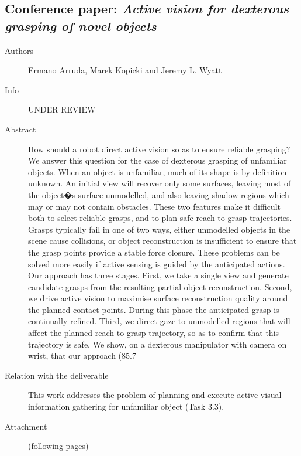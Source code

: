 \documentclass[a4paper,11pt,pdf]{../templates/pacmanreport}
\begin{document}

\subsection{Conference paper: \em Active vision for dexterous grasping of novel objects}
\begin{description}
    \item[Authors] Ermano Arruda, Marek Kopicki and Jeremy L. Wyatt
    \item[Info] UNDER REVIEW %
    \item[Abstract] How should a robot direct active vision so as to ensure reliable grasping? We answer this question for the case of dexterous grasping of unfamiliar objects. When an object is unfamiliar, much of its shape is by definition unknown. An initial view will recover only some surfaces, leaving most of the object�s surface unmodelled, and also leaving shadow regions which may or may not contain obstacles. These two features make it difficult both to select reliable grasps, and to plan safe reach-to-grasp trajectories. Grasps typically fail in one of two ways, either unmodelled objects in the scene cause collisions, or object reconstruction is insufficient to ensure that the grasp points provide a stable force closure. These problems can be solved more easily if active sensing is guided by the anticipated actions. Our approach has three stages. First, we take a single view and generate candidate grasps from the resulting partial object reconstruction. Second, we drive active vision to maximise surface reconstruction quality around the planned contact points. During this phase the anticipated grasp is continually refined. Third, we direct gaze to unmodelled regions that will affect the planned reach to grasp trajectory, so as to confirm that this trajectory is safe. We show, on a dexterous manipulator with camera on wrist, that our approach (85.7%
    \item [Relation with the deliverable] This work addresses the problem of planning and execute active visual information gathering for unfamiliar object (Task 3.3).
    \item[Attachment] (following pages) %
\end{description}

\end{document}
